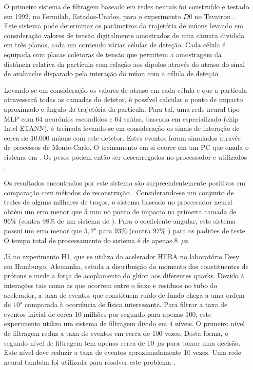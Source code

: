 O primeiro sistema de filtragem baseado em redes neurais foi construído e
testado em 1992, no Fermilab, Estados-Unidos, para o experimento $D0$ no
Tevatron \cite{lindsey-nim-1992}. Este sistema pode determinar os parâmetros
da trajetória de múons levando em consideração valores de tensão digitalmente
amostrados de uma câmara dividida em três planos, cada um contendo várias
células de deteção. Cada célula é equipada com placas coletoras de tensão que
permitem a amostragem da distância relativa da partícula com relação aos
dipolos através do atraso do sinal de avalanche disparado pela interação do
múon com a célula de deteção.

Levando-se em consideração os valores de atraso em cada célula e que a
partícula atravessará todas as camadas do detetor, é possível calcular o ponto
de impacto aproximado e ângulo da trajetória da partícula. Para tal, uma
rede neural tipo MLP com 64 neurônios escondidos e 64 saídas, baseada em
 especializado (chip Intel ETANN), é treinada levando-se em
consideração os sinais de interação de cerca de 10.000 múons com este
detetor. Estes eventos foram simulados através de processos de Monte-Carlo. O
treinamento em si ocorre em um PC que emula o sistema em . Os
pesos podem então ser descarregados no processador e utilizados
.

Os resultados encontrados por este sistema são surpreendentemente positivos em
comparação com métodos de reconstrução . Considerando-se um
conjunto de testes de alguns milhares de traços, o sistema baseado no
processador neural obtém um erro menor que 5 mm no ponto de impacto na
primeira camada de 96\% (contra 98\% de um sistema de 
). Para o coeficiente angular, este sistema possui um erro menor
que $5,7^{o}$ para 93\% (contra 97\% ) para os padrões de
teste. O tempo total de processamento do sistema é de apenas 8~$\mu$s.

Já no experimento H1, que se utiliza do acelerador HERA no laboratório Desy em
Hamburgo, Alemanha, estuda a distribuição do momento dos constituentes de
prótons e mede a força de acoplamento do glúon aos diferentes quarks. Devido à
interações tais como as que ocorrem entre o feixe e resíduos no tubo do
acelerador, a taxa de eventos que constituem ruído de fundo chega a uma ordem
de $10^5$ comparada à ocorrência de física interessante. Para filtrar a taxa
de eventos inicial de cerca 10 milhões por segundo para apenas 100, este
experimento utiliza um sistema de filtragem divido em 4 níveis. O primeiro
nível de filtragem reduz a taxa de eventos em cerca de 100 vezes. Desta forma,
o segundo nível de filtragem tem apenas cerca de 10~$\mu$s para tomar uma
decisão. Este nível deve reduzir a taxa de eventos aproximadamente 10
vezes. Uma rede neural também foi utilizada para resolver este problema
\cite{kohne-nim-1997}. 

